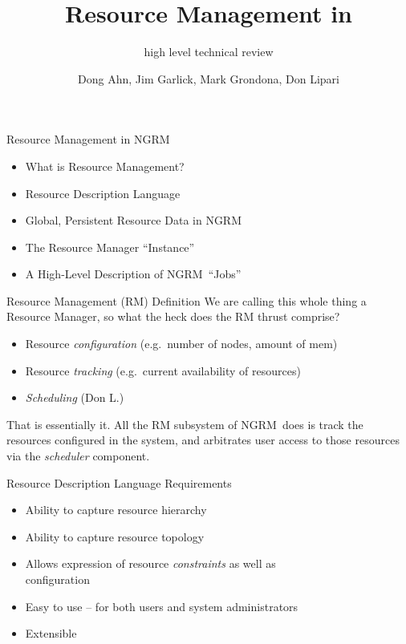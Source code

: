 \documentclass[default,pdf,colorBG,slideColor]{prosper}
\title{Resource Management in \ngrm}
\subtitle{{\small high level technical review}}
\author{Dong Ahn, Jim Garlick, Mark Grondona, Don Lipari}
\newcommand{\ngrm}{NGRM}
\begin{document}
\maketitle
\begin{slide}{Resource Management in \ngrm}
\begin{itemize}
 \item What is Resource Management?
 \item Resource Description Language
 \item Global, Persistent Resource Data in \ngrm
 \item The Resource Manager ``Instance''
 \item A High-Level Description of \ngrm\ ``Jobs''
\end{itemize}

\end{slide}
\begin{slide}{Resource Management (RM) Definition}
We are calling this whole thing a Resource Manager, so what the
heck does the RM thrust comprise?
\begin{itemize}
 \item Resource \emph{configuration} (e.g.\ number of nodes, amount of mem)
 \item Resource \emph{tracking} (e.g.\ current availability of resources)
 \item \emph{Scheduling} (Don L.)
\end{itemize}
That is essentially it. All the RM subsystem of \ngrm\ does is track
the resources configured in the system, and arbitrates user access to
those resources via the \emph{scheduler} component.
\end{slide}
\begin{slide}{Resource Description Language}
{\centering Requirements}
 \begin{itemize}
   \item Ability to capture resource hierarchy
   \item Ability to capture resource topology
   \item {Allows expression of resource \emph{constraints} as well as\\
         configuration}
   \item Easy to use -- for both users and system administrators
   \item Extensible
 \end{itemize}
\end{slide}
\end{document}
